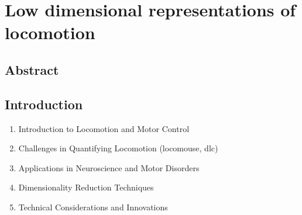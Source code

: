 
%

\chapter{Low dimensional representations of locomotion}
\label{cha:lda}
\glsresetall

\section{Abstract}
\section{Introduction}
\begin{enumerate}
    \item Introduction to Locomotion and Motor Control
    \item Challenges in Quantifying Locomotion (locomouse, dlc)
    \item Applications in Neuroscience and Motor Disorders
    \item Dimensionality Reduction Techniques
    \item Technical Considerations and Innovations
\end{enumerate}

